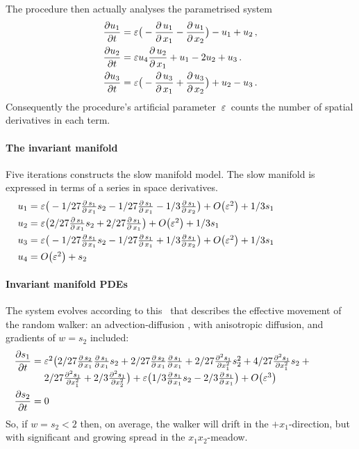The procedure then actually analyses the parametrised system
\begin{align*}&
\D t{u_{1}}=\eps \big(-\frac{\partial\,u_1}{\partial\,x_1}-\frac{\partial
\,u_1}{\partial\,x_2}\big)-u_1+u_2\,,
\\&
\D t{u_{2}}=\eps u_4\frac{\partial\,u_2}{\partial\,x_1}+u_1-2 u_2+u_3\,.
\\&
\D t{u_{3}}=\eps \big(-\frac{\partial\,u_3}{\partial\,x_1}+\frac{\partial
\,u_3}{\partial\,x_2}\big)+u_2-u_3\,.
\end{align*}
Consequently the procedure's artificial parameter~\(\varepsilon\)\
counts the number of spatial derivatives in each term.


\paragraph{The invariant manifold} 
Five iterations constructs the slow manifold model. The slow
manifold is expressed in terms of a series in space
derivatives.
\begin{align*}&
u_{1}=\ParMath{ \eps \big(-1/27 \frac{\partial \,s_{1}}{\partial \,x_1} s_{2}-1/
27 \frac{\partial \,s_{1}}{\partial \,x_1}-1/3 \frac{\partial \,s_{1}}{
\partial \,x_2}\big)+O\big(\varepsilon ^{2}\big)+1/3 s_{1}
}\\&
u_{2}=\ParMath{ \eps \big(2/27 \frac{\partial \,s_{1}}{\partial \,x_1} s_{2}+2/27
 \frac{\partial \,s_{1}}{\partial \,x_1}\big)+O\big(\varepsilon ^{2}
\big)+1/3 s_{1}
}\\&
u_{3}=\ParMath{ \eps \big(-1/27 \frac{\partial \,s_{1}}{\partial \,x_1} s_{2}-1/
27 \frac{\partial \,s_{1}}{\partial \,x_1}+1/3 \frac{\partial \,s_{1}}{
\partial \,x_2}\big)+O\big(\varepsilon ^{2}\big)+1/3 s_{1}
}\\&
u_4=\ParMath{ O\big(\varepsilon ^{2}\big)+s_{2}
}\end{align*}

 
\paragraph{Invariant manifold PDEs} 
The system evolves according to this \pde\ that describes
the effective movement of the random walker: an
advection-diffusion \pde, with anisotropic diffusion, and
gradients of \(w=s_2\) included:
\begin{align*}&
\D t{s_{1}}=\ParMath{ \eps^{2} \big(2/27 \frac{\partial \,s_{2}}{\partial \,x_1} 
\frac{\partial \,s_{1}}{\partial \,x_1} s_{2}+2/27 \frac{\partial \,s_{
2}}{\partial \,x_1} \frac{\partial \,s_{1}}{\partial \,x_1}+2/27 
\frac{\partial ^{2}s_{1}}{\partial x_1^{2}} s_{2}^{2}+4/27 \frac{
\partial ^{2}s_{1}}{\partial x_1^{2}} s_{2}+2/27 \frac{\partial ^{2}s_{
1}}{\partial x_1^{2}}+2/3 \frac{\partial ^{2}s_{1}}{\partial x_2^{2}}
\big)+\eps \big(1/3 \frac{\partial \,s_{1}}{\partial \,x_1} s_{2}-2/3 
\frac{\partial \,s_{1}}{\partial \,x_1}\big)+O\big(\varepsilon ^{3}
\big)
}\\&
\D t{s_2}=0
\end{align*}
So, if \(w=s_2<2\) then, on average, the walker will drift in the
\(+x_1\)-direction, but with significant and growing spread
in the \(x_1x_2\)-meadow.


